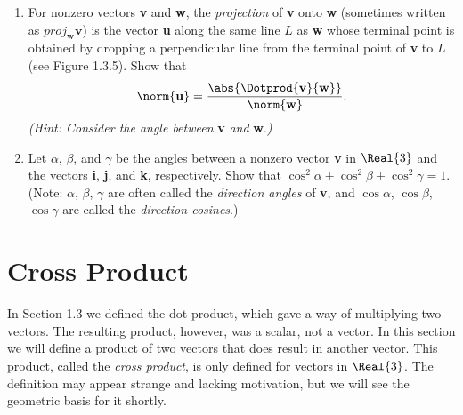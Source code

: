 \begin{enumerate}[\bfseries 1.]
 \piccaption[]{}
 \item For nonzero vectors \textbf{v} and \textbf{w}, the \emph{projection} of \textbf{v} onto
  \textbf{w} (sometimes written as $proj_{\textbf{w}}\textbf{v}$) is the vector \textbf{u} along the same line $L$ as
  \textbf{w} whose terminal point is obtained by dropping a perpendicular line from the terminal point of \textbf{v}
  to $L$ (see Figure 1.3.5). Show that
  \begin{displaymath}
   \norm{\textbf{u}} = \frac{\abs{\Dotprod{\textbf{v}}{\textbf{w}}}}{\norm{\textbf{w}}}.
  \end{displaymath}
  \emph{(Hint: Consider the angle between} \textbf{v} \emph{and} \textbf{w}.\emph{)}
 \item Let $\alpha$, $\beta$, and $\gamma$ be the angles between a nonzero vector \textbf{v} in $\Real{3}$ and the
  vectors \textbf{i}, \textbf{j}, and \textbf{k}, respectively. Show that $\cos^2 \alpha + \cos^2 \beta +
  \cos^2 \gamma = 1$.\\
  (Note: $\alpha$, $\beta$, $\gamma$ are often called the \emph{direction angles} of \textbf{v},
  and $\cos \alpha$, $\cos \beta$, $\cos \gamma$ are called the \emph{direction cosines}.)
\end{enumerate}
\newpage
\section{Cross Product}
In Section 1.3 we defined the dot product, which gave a way of multiplying two vectors. The resulting product,
however, was a scalar, not a vector. In this section we will define a product of two vectors that does result in
another vector. This product, called the \emph{cross product}, is only defined for vectors
in $\Real{3}$. The definition may appear strange and lacking motivation, but we will see the geometric basis for
it shortly.



